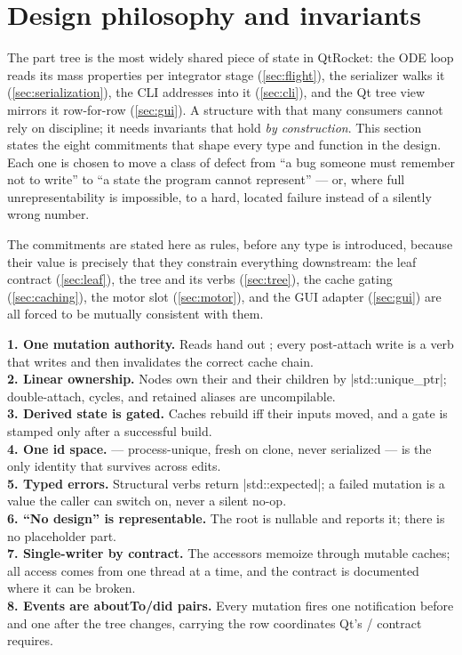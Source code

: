 \section{Design philosophy and invariants}\label{sec:philosophy}

The part tree is the most widely shared piece of state in QtRocket: the ODE loop reads its
mass properties per integrator stage (\cref{sec:flight}), the serializer walks it
(\cref{sec:serialization}), the CLI addresses into it (\cref{sec:cli}), and the Qt tree view
mirrors it row-for-row (\cref{sec:gui}). A structure with that many consumers cannot rely on
discipline; it needs invariants that hold \emph{by construction}. This section states the
eight commitments that shape every type and function in the design. Each one is chosen to move
a class of defect from ``a bug someone must remember not to write'' to ``a state the program
cannot represent'' --- or, where full unrepresentability is impossible, to a hard, located
failure instead of a silently wrong number.

The commitments are stated here as rules, before any type is introduced, because their value
is precisely that they constrain everything downstream: the leaf contract
(\cref{sec:leaf}), the tree and its verbs (\cref{sec:tree}), the cache gating
(\cref{sec:caching}), the motor slot (\cref{sec:motor}), and the GUI adapter
(\cref{sec:gui}) are all forced to be mutually consistent with them.

\begin{designrule}
\textbf{1. One mutation authority.} Reads hand out ; every post-attach
write is a  verb that writes and then invalidates the correct cache chain. \\[2pt]
\textbf{2. Linear ownership.} Nodes own their  and their children by
\cppinline|std::unique_ptr|; double-attach, cycles, and retained aliases are uncompilable. \\[2pt]
\textbf{3. Derived state is gated.} Caches rebuild iff their inputs moved, and a gate is
stamped only after a successful build. \\[2pt]
\textbf{4. One id space.}  --- process-unique, fresh on clone, never
serialized --- is the only identity that survives across edits. \\[2pt]
\textbf{5. Typed errors.} Structural verbs return \cppinline|std::expected|; a failed
mutation is a value the caller can switch on, never a silent no-op. \\[2pt]
\textbf{6. ``No design'' is representable.} The root is nullable and 
reports it; there is no placeholder part. \\[2pt]
\textbf{7. Single-writer by contract.} The  accessors memoize through mutable
caches; all access comes from one thread at a time, and the contract is documented where it
can be broken. \\[2pt]
\textbf{8. Events are aboutTo/did pairs.} Every mutation fires one notification before and
one after the tree changes, carrying the row coordinates Qt's
/ contract requires.
\end{designrule}

